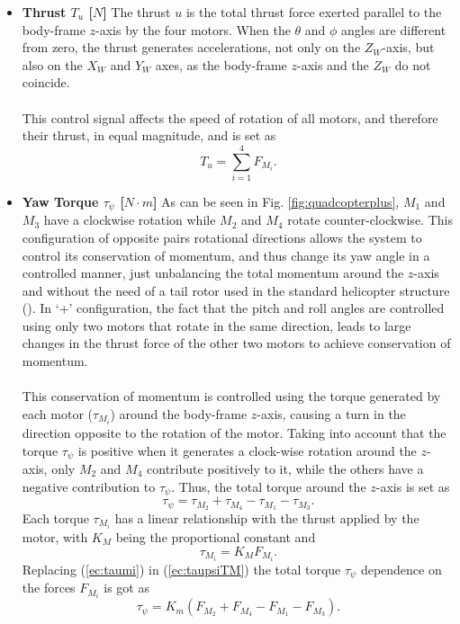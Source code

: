 \begin{itemize}
\item \textbf{Thrust $T_u$ [$N$]}
The thrust $u$ is the total thrust force exerted parallel to the body-frame $z$-axis by the four motors. When the $\theta$ and $\phi$ angles are different from zero, the thrust generates accelerations, not only on the $Z_W$-axis, but also on the $X_W$ and $Y_W$ axes, as the body-frame $z$-axis and the $Z_W$ do not coincide.
\\\\
This control signal affects the speed of rotation of all motors, and therefore their thrust, in equal magnitude, and is set as
\begin{equation}
\label{ec:u+}
T_u = \sum_{i=1}^{4}F_{M_i}.
\end{equation}

\item \textbf{Yaw Torque $\tau_{\psi}$ [$N\cdot m$]}
As can be seen in Fig. \ref{fig:quadcopterplus}, $M_1$ and $M_3$ have a clockwise rotation while $M_2$ and $M_4$ rotate counter-clockwise. This configuration of opposite pairs rotational directions allows the system to control its conservation of momentum, and thus change its yaw angle in a controlled manner, just unbalancing the total momentum around the $z$-axis and without the need of a tail rotor used in the standard helicopter structure (\cite{Bresciani2008}). In `+' configuration, the fact that the pitch and roll angles are controlled using only two motors that rotate in the same direction, leads to large changes in the thrust force of the other two motors to achieve conservation of momentum.
\\\\
This conservation of momentum is controlled using the torque generated by each motor ($\tau_{M_i}$) around the body-frame $z$-axis, causing a turn in the direction opposite to the rotation of the motor. Taking into account that the torque $\tau_\psi$ is positive when it generates a clock-wise rotation around the $z$-axis, only $M_2$ and $M_4$ contribute positively to it, while the others have a negative contribution to $\tau_\psi$. Thus, the total torque around the $z$-axis is set as
\begin{equation}
\label{ec:taupsiTM}
\tau_{\psi} = \tau_{M_2} + \tau_{M_4} - \tau_{M_1} - \tau_{M_3}.
\end{equation}
Each torque $\tau_{M_i}$ has a linear relationship with the thrust applied by the motor, with $K_M$ being the proportional constant and
\begin{equation}
\label{ec:taumi}
\tau_{M_{i}} = K_{M}F_{M_i}.
\end{equation}
Replacing (\ref{ec:taumi}) in (\ref{ec:taupsiTM}) the total torque $\tau_\psi$ dependence on the forces $F_{M_i}$ is got as
\begin{equation}
\label{ec:taupsi+}
\tau_{\psi} = K_{m}(F_{M_2} + F_{M_4} - F_{M_1} - F_{M_3}).
\end{equation}


\end{itemize}
